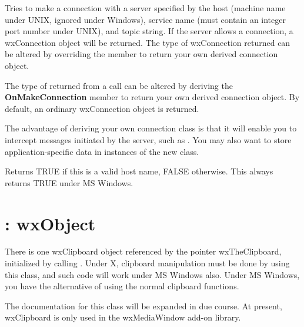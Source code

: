 
Tries to make a connection with a server specified by the host
(machine name under UNIX, ignored under Windows), service name (must
contain an integer port number under UNIX), and topic string. If the
server allows a connection, a wxConnection object will be returned.
The type of wxConnection returned can be altered by overriding
the  member to return your own
derived connection object.

\label{wxclientonmakeconnection}


The type of  returned from a  call can
be altered by deriving the {\bf OnMakeConnection} member to return your
own derived connection object. By default, an ordinary wxConnection
object is returned.

The advantage of deriving your own connection class is that it will
enable you to intercept messages initiated by the server, such
as . You may also want to
store application-specific data in instances of the new class.



Returns TRUE if this is a valid host name, FALSE otherwise. This always
returns TRUE under MS Windows.

\section{: wxObject}\label{wxclipboard}

There is one wxClipboard object referenced by the pointer
wxTheClipboard, initialized by calling .
Under X, clipboard manipulation must be done by using this class, and
such code will work under MS Windows also. Under MS Windows, you have the
alternative of using the normal clipboard functions.

The documentation for this class will be expanded in due course. At present,
wxClipboard is only used in the wxMediaWindow add-on library.

